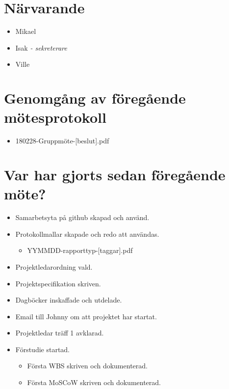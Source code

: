 
\section*{Närvarande}
\begin{itemize}[noitemsep]
    \item Mikael
    \item Isak \textit{- sekreterare}
    \item Ville
\end{itemize}

\section*{Genomgång av föregående mötesprotokoll}
\begin{itemize}[noitemsep]
    \item 180228-Gruppmöte-[beslut].pdf
\end{itemize}

\section*{Var har gjorts sedan föregående möte?}

\begin{itemize}[noitemsep]
    \item Samarbetsyta på github skapad och använd.
    \item Protokollmallar skapade och redo att användas.
    \begin{itemize}[noitemsep]
        \item YYMMDD-rapporttyp-[taggar].pdf
    \end{itemize}
    \item Projektledarordning vald.
    \item Projektspecifikation skriven.
    \item Dagböcker inskaffade och utdelade.
    \item Email till Johnny om att projektet har startat.
    \item Projektledar träff 1 avklarad.
    \item Förstudie startad.
    \begin{itemize}[noitemsep]
        \item Första WBS skriven och dokumenterad.
        \item Första MoSCoW skriven och dokumenterad.
    \end{itemize}
\end{itemize}

